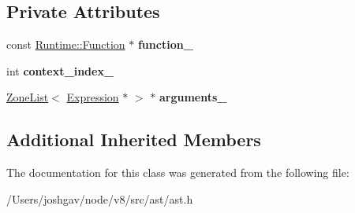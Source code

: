 \subsection*{Private Attributes}
\begin{DoxyCompactItemize}
\item 
const \hyperlink{structv8_1_1internal_1_1_runtime_1_1_function}{Runtime\+::\+Function} $\ast$ {\bfseries function\+\_\+}\hypertarget{classv8_1_1internal_1_1_call_runtime_a76f8938038102811da75a99de9b1ab48}{}\label{classv8_1_1internal_1_1_call_runtime_a76f8938038102811da75a99de9b1ab48}

\item 
int {\bfseries context\+\_\+index\+\_\+}\hypertarget{classv8_1_1internal_1_1_call_runtime_a8efda92ce105c8eb4840bf46f1666a40}{}\label{classv8_1_1internal_1_1_call_runtime_a8efda92ce105c8eb4840bf46f1666a40}

\item 
\hyperlink{classv8_1_1internal_1_1_zone_list}{Zone\+List}$<$ \hyperlink{classv8_1_1internal_1_1_expression}{Expression} $\ast$ $>$ $\ast$ {\bfseries arguments\+\_\+}\hypertarget{classv8_1_1internal_1_1_call_runtime_a89bb3472f43835524f60c2459ce18b00}{}\label{classv8_1_1internal_1_1_call_runtime_a89bb3472f43835524f60c2459ce18b00}

\end{DoxyCompactItemize}
\subsection*{Additional Inherited Members}


The documentation for this class was generated from the following file\+:\begin{DoxyCompactItemize}
\item 
/\+Users/joshgav/node/v8/src/ast/ast.\+h\end{DoxyCompactItemize}
